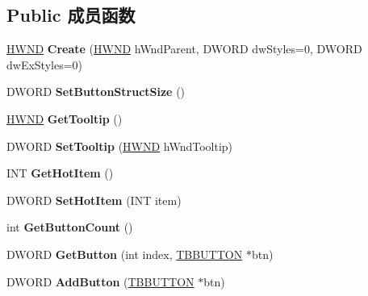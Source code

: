 \subsection*{Public 成员函数}
\begin{DoxyCompactItemize}
\item 
\mbox{\label{class_c_toolbar_a48bf68003424ee35d85cd51882939ec0}} 
\hyperlink{interfacevoid}{H\+W\+ND} {\bfseries Create} (\hyperlink{interfacevoid}{H\+W\+ND} h\+Wnd\+Parent, D\+W\+O\+RD dw\+Styles=0, D\+W\+O\+RD dw\+Ex\+Styles=0)
\item 
\mbox{\label{class_c_toolbar_a6293438f7a8223265b6b6beeadaae767}} 
D\+W\+O\+RD {\bfseries Set\+Button\+Struct\+Size} ()
\item 
\mbox{\label{class_c_toolbar_ac03027eed5bd6e323777939e997d0921}} 
\hyperlink{interfacevoid}{H\+W\+ND} {\bfseries Get\+Tooltip} ()
\item 
\mbox{\label{class_c_toolbar_abd88a27b1cb15634d959cbd470f63cf0}} 
D\+W\+O\+RD {\bfseries Set\+Tooltip} (\hyperlink{interfacevoid}{H\+W\+ND} h\+Wnd\+Tooltip)
\item 
\mbox{\label{class_c_toolbar_a56ac72ca173a18eb3eb27cb835a9c75d}} 
I\+NT {\bfseries Get\+Hot\+Item} ()
\item 
\mbox{\label{class_c_toolbar_a3298c26cc16c16968975acbdb18212e2}} 
D\+W\+O\+RD {\bfseries Set\+Hot\+Item} (I\+NT item)
\item 
\mbox{\label{class_c_toolbar_a6f9fbfb624f011af6a9cc2aafc3abc17}} 
int {\bfseries Get\+Button\+Count} ()
\item 
\mbox{\label{class_c_toolbar_a1c7485f7bc185b6edbc17b0e96e8dde4}} 
D\+W\+O\+RD {\bfseries Get\+Button} (int index, \hyperlink{struct___t_b_b_u_t_t_o_n}{T\+B\+B\+U\+T\+T\+ON} $\ast$btn)
\item 
\mbox{\label{class_c_toolbar_a293a11b85a134d2d56624d0320fc518a}} 
D\+W\+O\+RD {\bfseries Add\+Button} (\hyperlink{struct___t_b_b_u_t_t_o_n}{T\+B\+B\+U\+T\+T\+ON} $\ast$btn)
\item 

\end{DoxyCompactItemize}
